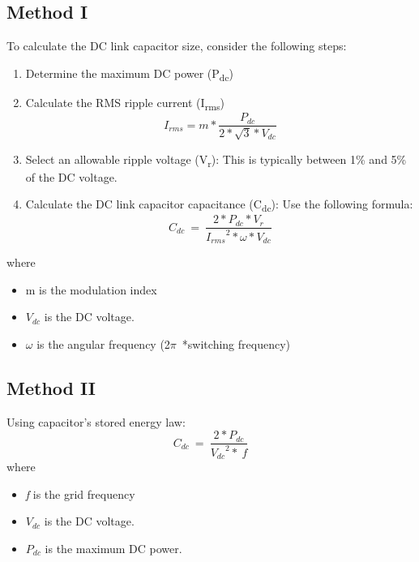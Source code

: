 \documentclass[12pt,a4paper]{book}
\begin{document}
\subsection{Method I}
To calculate the DC link capacitor size, consider the following steps:
\begin{enumerate}
  \item Determine the maximum DC power (P\textsubscript{dc})
  \item Calculate the RMS ripple current (I\textsubscript{rms})
  \begin{equation}
    I_{rms} = m*\frac{P_{dc}}{2*\sqrt{3}*V_{dc}}
    \label{equation:eq41}
  \end{equation}
  \item Select an allowable ripple voltage (V\textsubscript{r}): This is typically between 1\% and 5\% of the DC voltage.
  \item Calculate the DC link capacitor capacitance (C\textsubscript{dc}): Use the following formula:
  \begin{equation}
    C_{dc}\  = \ \frac{2*P_{dc}*V_{r}}{{I_{rms}}^{2}*\omega*V_{dc}}
    \label{equation:eq42}
  \end{equation}
\end{enumerate}
where
\begin{itemize}
  \item m is the modulation index
  \item \(V_{dc}\) is the DC voltage.
  \item \(\omega\) is the angular frequency (2\(\pi\)\ *switching frequency)
\end{itemize}

\subsection{Method II}
Using capacitor's stored energy law:
\begin{equation}
  C_{dc}\  = \ \frac{2*P_{dc}}{{V_{dc}}^{2}*\ f}
  \label{equation:eq43}
\end{equation}
where
\begin{itemize}
  \item \emph{f} is the grid frequency
  \item \(V_{dc}\) is the DC voltage.
  \item \(P_{dc}\) is the maximum DC power.
\end{itemize}
\end{document}
